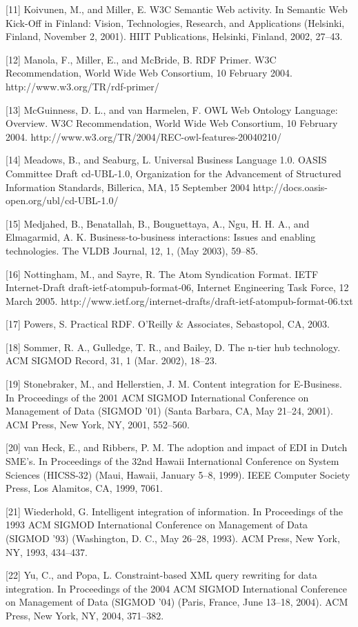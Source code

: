 \documentclass{CRPITStyle}
\begin{document}
[11]	Koivunen, M., and Miller, E. W3C Semantic Web activity. In
Semantic Web Kick-Off in Finland: Vision, Technologies, Research, and
Applications (Helsinki, Finland, November 2, 2001). HIIT Publications,
Helsinki, Finland, 2002, 27--43.

[12]	Manola, F., Miller, E., and McBride, B. RDF Primer. W3C
Recommendation, World Wide Web Consortium, 10 February 2004.
http://www.w3.org/TR/rdf-primer/

[13]	McGuinness, D. L., and van Harmelen, F. OWL Web Ontology
Language: Overview. W3C Recommendation, World Wide Web Consortium, 10
February 2004. http://www.w3.org/TR/2004/REC-owl-features-20040210/

[14]	Meadows, B., and Seaburg, L. Universal Business Language 1.0.
OASIS Committee Draft cd-UBL-1.0, Organization for the Advancement of
Structured Information Standards, Billerica, MA, 15 September 2004
http://docs.oasis-open.org/ubl/cd-UBL-1.0/

[15]	Medjahed, B., Benatallah, B., Bouguettaya, A., Ngu, H. H. A.,
and Elmagarmid, A. K. Business-to-business interactions: Issues and
enabling technologies. The VLDB Journal, 12, 1, (May 2003), 59--85.

[16]	Nottingham, M., and Sayre, R. The Atom Syndication Format. IETF
Internet-Draft draft-ietf-atompub-format-06, Internet Engineering Task
Force, 12 March 2005.
http://www.ietf.org/internet-drafts/draft-ietf-atompub-format-06.txt

[17]	Powers, S. Practical RDF. O'Reilly \& Associates, Sebastopol, CA,
2003.

[18]	Sommer, R. A., Gulledge, T. R., and Bailey, D. The n-tier hub
technology. ACM SIGMOD Record, 31, 1 (Mar. 2002), 18--23.

[19]	Stonebraker, M., and Hellerstien, J. M. Content integration for
E-Business. In Proceedings of the 2001 ACM SIGMOD International
Conference on Management of Data (SIGMOD '01) (Santa Barbara, CA, May
21--24, 2001). ACM Press, New York, NY, 2001, 552--560.

[20]	van Heck, E., and Ribbers, P. M. The adoption and impact of EDI
in Dutch SME's. In Proceedings of the 32nd Hawaii International
Conference on System Sciences (HICSS-32) (Maui, Hawaii, January 5--8,
1999). IEEE Computer Society Press, Los Alamitos, CA, 1999, 7061.

[21]	Wiederhold, G. Intelligent integration of information. In
Proceedings of the 1993 ACM SIGMOD International Conference on
Management of Data (SIGMOD '93) (Washington, D. C., May 26--28, 1993).
ACM Press, New York, NY, 1993, 434--437.

[22]	Yu, C., and Popa, L. Constraint-based XML query rewriting for
data integration. In Proceedings of the 2004 ACM SIGMOD International
Conference on Management of Data (SIGMOD '04) (Paris, France, June
13--18, 2004). ACM Press, New York, NY, 2004, 371--382.
\end{document}
